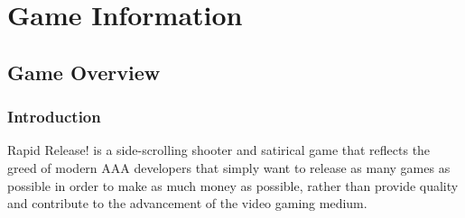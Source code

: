 \documentclass[11pt,fleqn]{book} %
\begin{document}




\pagestyle{empty} %

\tableofcontents %

\cleardoublepage %

\pagestyle{fancy} %


\part{Game Information}



\chapter{Game Overview}

\section{Introduction}

Rapid Release! is a side-scrolling shooter and satirical game that reflects the greed of modern AAA developers that simply want to release as many games as possible in order to make as much money as possible, rather than provide quality and contribute to the advancement of the video gaming medium.
\vspace{-\baselineskip}
\end{document}
